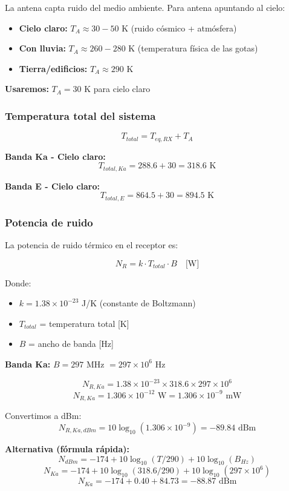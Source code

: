 \documentclass[a4paper,10pt]{article}
\begin{document}
La antena capta ruido del medio ambiente. Para antena apuntando al cielo:

\begin{itemize}
    \item \textbf{Cielo claro:} $T_A \approx 30-50$ K (ruido cósmico + atmósfera)
    \item \textbf{Con lluvia:} $T_A \approx 260-280$ K (temperatura física de las gotas)
    \item \textbf{Tierra/edificios:} $T_A \approx 290$ K
\end{itemize}

\textbf{Usaremos:} $T_A = 30$ K para cielo claro

\subsubsection{Temperatura total del sistema}

$$T_{total} = T_{eq,RX} + T_A$$

\textbf{Banda Ka - Cielo claro:}
$$T_{total,Ka} = 288.6 + 30 = \boxed{318.6 \text{ K}}$$

\textbf{Banda E - Cielo claro:}
$$T_{total,E} = 864.5 + 30 = \boxed{894.5 \text{ K}}$$

\subsubsection{Potencia de ruido}

La potencia de ruido térmico en el receptor es:

$$N_R = k \cdot T_{total} \cdot B \quad \text{[W]}$$

Donde:
\begin{itemize}
    \item $k = 1.38 \times 10^{-23}$ J/K (constante de Boltzmann)
    \item $T_{total}$ = temperatura total [K]
    \item $B$ = ancho de banda [Hz]
\end{itemize}

\textbf{Banda Ka:} $B = 297$ MHz $= 297 \times 10^6$ Hz

$$N_{R,Ka} = 1.38 \times 10^{-23} \times 318.6 \times 297 \times 10^6$$
$$N_{R,Ka} = 1.306 \times 10^{-12} \text{ W} = 1.306 \times 10^{-9} \text{ mW}$$

Convertimos a dBm:
$$N_{R,Ka,dBm} = 10\log_{10}(1.306 \times 10^{-9}) = -89.84 \text{ dBm}$$

\textbf{Alternativa (fórmula rápida):}
$$N_{dBm} = -174 + 10\log_{10}(T/290) + 10\log_{10}(B_{Hz})$$
$$N_{Ka} = -174 + 10\log_{10}(318.6/290) + 10\log_{10}(297 \times 10^6)$$
$$N_{Ka} = -174 + 0.40 + 84.73 = \boxed{-88.87 \text{ dBm}}$$
\end{document}
